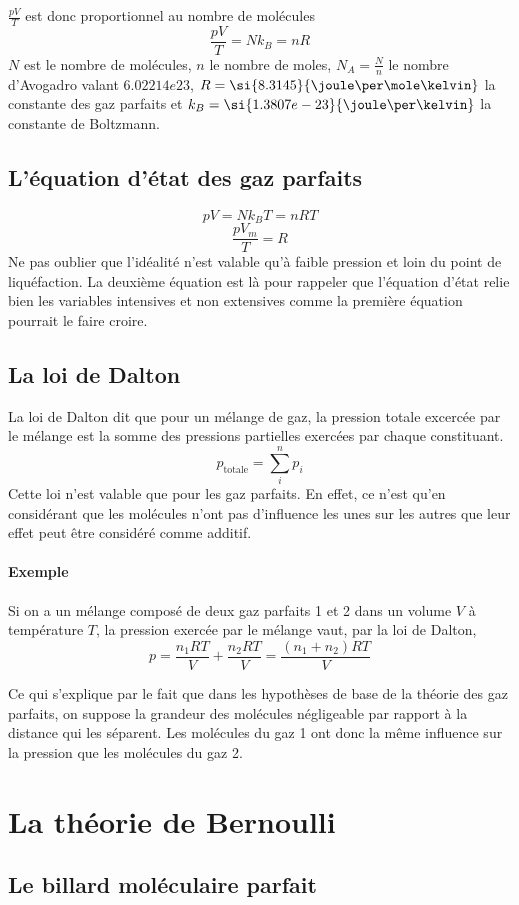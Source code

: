 $\frac{pV}{T}$ est donc proportionnel au nombre de molécules
\[ \frac{pV}{T} = Nk_B = nR \]
$N$ est le nombre de molécules,
$n$ le nombre de moles,
$N_A = \frac{N}{n}$ le nombre d'Avogadro valant $\si{6.02214e23}{}$,
$R = \si{8.3145}{\joule\per\mole\kelvin}$ la constante des gaz parfaits et
$k_B = \si{1.3807e-23}{\joule\per\kelvin}$ la constante de Boltzmann.

\subsection{L'équation d'état des gaz parfaits}
\[ pV = Nk_BT = nRT \]
\[ \frac{pV_m}{T} = R \]
Ne pas oublier que l'idéalité n'est valable qu'à faible pression et
loin du point de liquéfaction.
La deuxième équation est là pour rappeler que l'équation d'état relie bien
les variables intensives et non extensives comme la première équation pourrait
le faire croire.

\subsection{La loi de Dalton}
La loi de Dalton dit que pour un mélange de gaz, la pression totale
excercée par le mélange est la somme des pressions partielles exercées
par chaque constituant.
\[ p_\mathrm{totale} = \sum_i^n p_i \]
Cette loi n'est valable que pour les gaz parfaits.
En effet, ce n'est qu'en considérant que les molécules n'ont pas d'influence
les unes sur les autres que leur effet peut être considéré comme additif.
\paragraph{Exemple}
Si on a un mélange composé de deux gaz parfaits 1 et 2
dans un volume $V$ à température $T$,
la pression exercée par le mélange vaut, par la loi de Dalton,
\[ p = \frac{n_1 R T}{V} + \frac{n_2 R T}{V} = \frac{(n_1 + n_2) R T}{V} \]

Ce qui s'explique par le fait que dans les hypothèses de base
de la théorie des gaz parfaits, on suppose la grandeur des molécules
négligeable par rapport à la distance qui les séparent.
Les molécules du gaz 1 ont donc la même influence sur la pression que
les molécules du gaz 2.

\section{La théorie de Bernoulli}
\subsection{Le billard moléculaire parfait}
